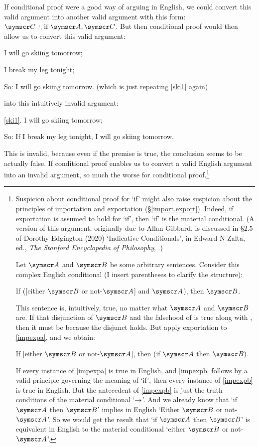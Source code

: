 If conditional proof were a good way of arguing in English, we could convert this valid argument into another valid argument with this form: $\meta{C} \ttherefore \text{if }\meta{A}, \meta{C}$. But then conditional proof would then allow us to convert this valid argument: \begin{earg}
	\item[\ex{ski1}] I will go skiing tomorrow;
	\item[\ex{ski2}] I break my leg tonight;
	\item[So:] I will go skiing tomorrow. \qquad(which is just repeating \ref{ski1} again)
\end{earg} into this intuitively invalid argument:
\begin{earg}
	\item[\ref{ski1}.] I will go skiing tomorrow;
	\item[So:] If I break my leg tonight, I will go skiing tomorrow.
\end{earg} This is invalid, because even if the premise is true, the conclusion seems to be actually false. If conditional proof enables us to convert a valid English argument into an invalid argument, so much the worse for conditional proof.\footnote{Suspicion about conditional proof for `if' might also raise suspicion about the principles of importation and exportation (§\ref{import.export}). Indeed, if exportation is assumed to hold for `if', then `if' is the material conditional. (A version of this argument, originally due to Allan Gibbard, is discussed in §2.5 of Dorothy Edgington (2020) `Indicative Conditionals', in Edward N Zalta, ed., \emph{The Stanford Encyclopedia of Philosophy}, .)

 Let $\meta{A}$ and $\meta{B}$ be some arbitrary sentences. Consider this complex English conditional (I insert parentheses to clarify the structure): 
\begin{earg}
	\item[\ex{impexpa}] If ([either $\meta{B}$ or not-$\meta{A}$] and $\meta{A}$), then $\meta{B}$. 
\end{earg}
This sentence is, intuitively, true, no matter what $\meta{A}$ and $\meta{B}$ are. If that disjunction of $\meta{B}$ and the falsehood of  is true along with , then it must be because the disjunct  holds. But apply exportation to \ref{impexpa}, and we obtain:
\begin{earg}
	\item[\ex{impexpb}] If [either $\meta{B}$ or not-$\meta{A}$], then (if $\meta{A}$ then $\meta{B})$. 
\end{earg} If every instance of \ref{impexpa} is true in English, and \ref{impexpb} follows by a valid principle governing the meaning of `if', then every instance of \ref{impexpb} is true in English. But the antecedent of \ref{impexpb} is just the truth conditions of the material conditional `$\rightarrow$'. And we already know that `if $\meta{A}$ then $\meta{B}$' implies in English `Either $\meta{B}$ or not-$\meta{A}$'. So we would get the result that `if $\meta{A}$ then $\meta{B}$' is equivalent in English to the material conditional `either $\meta{B}$ or not-$\meta{A}$'.}


